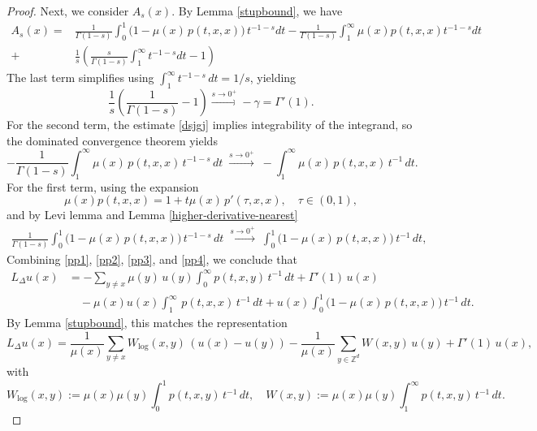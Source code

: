 \documentclass[reqno,12pt]{amsart}
\numberwithin{equation}{section}
\begin{document}
\begin{proof}
	Next, we consider $A_{s}\left(x\right).$ By Lemma \ref{stupbound}, we have
\begin{equation}
	\begin{aligned}\label{asx}
		A_s\left(x\right)=&\frac{1}{\Gamma\left(1-s\right)}\int_{0}^{1}\bigl(1-\mu(x)\,p(t,x,x)\bigr)\,t^{-1-s}dt-\frac{1}{\Gamma\left(1-s\right)}\int_{1}^{\infty}\mu(x)p(t,x,x)t^{-1-s}dt\\+&\frac{1}{s}\left(\frac{s}{\Gamma(1-s)}\int_1^{\infty}t^{-1-s}dt-1\right)
	\end{aligned}
\end{equation}
	The last term simplifies using \(\int_1^\infty t^{-1-s}\,dt = 1/s\), yielding
	\begin{equation} \label{pp2}
		\frac{1}{s} \left( \frac{1}{\Gamma(1-s)} - 1 \right) \xrightarrow[]{s \to 0^+} -\gamma = \Gamma'(1).
	\end{equation}
	For the second term, the estimate \eqref{dsjgj} implies integrability of the integrand, so the dominated convergence theorem yields
	\begin{equation}\label{pp3}
		-\frac{1}{\Gamma(1-s)}\int_{1}^{\infty}\mu(x)\,p(t,x,x)\,t^{-1-s}\,dt
		\;\xrightarrow[]{s\to0^+}\;
		-\int_{1}^{\infty}\mu(x)\,p(t,x,x)\,t^{-1}\,dt.
	\end{equation}
	For the first term, using the expansion
	\[
	\mu(x) p(t,x,x) = 1 + t\mu(x)\,p'(\tau,x,x), \quad \tau \in (0,1),
	\]
	and by Levi lemma and Lemma \ref{higher‐derivative-nearest}
	\begin{equation}
		\begin{aligned}\label{pp4}
			\frac{1}{\Gamma(1-s)}\int_{0}^{1}\bigl(1-\mu(x)\,p(t,x,x)\bigr)\,t^{-1-s}\,dt
			\;\xrightarrow[]{s\to0^+}\;
			\int_{0}^{1}\bigl(1-\mu(x)\,p(t,x,x)\bigr)\,t^{-1}\,dt,
		\end{aligned}
	\end{equation}
	Combining \eqref{pp1}, \eqref{pp2}, \eqref{pp3}, and \eqref{pp4}, we conclude that
	\[
	\begin{aligned}
		L_{\Delta} u(x)
		&= -\sum_{y \ne x} \mu(y)\,u(y) \int_0^\infty p(t,x,y)\,t^{-1} \,dt
		+ \Gamma'(1)\,u(x) \\
		&\quad - \mu(x)u(x) \int_1^\infty \,p(t,x,x)\,t^{-1} \,dt
		+ u(x) \int_0^1 \bigl(1 - \mu(x)\,p(t,x,x)\bigr)\,t^{-1} \,dt.
	\end{aligned}
	\]
	By Lemma \ref{stupbound}, this matches the representation
	\[
	L_{\Delta} u(x)
	= \frac{1}{\mu(x)} \sum_{y \ne x} W_{\log}(x,y)\,(u(x) - u(y))
	- \frac{1}{\mu(x)} \sum_{y \in \mathbb{Z}^d} W(x,y)\,u(y)
	+ \Gamma'(1)\,u(x),
	\]
	with
	\[
	W_{\log}(x,y) := \mu(x)\mu(y) \int_0^1 p(t,x,y)\,t^{-1} \,dt,
	\quad
	W(x,y) := \mu(x)\mu(y) \int_1^\infty p(t,x,y)\,t^{-1} \,dt.
	\]
\end{proof}
\end{document}
